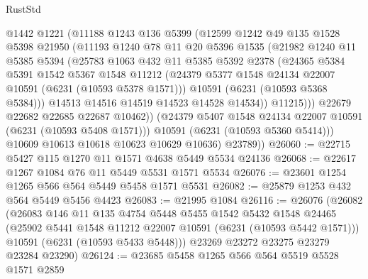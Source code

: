 \begin{lexlean}{RustStd}
\begin{coremodule}
{{                @1442
                @1221
                (@11188
                  @1243
                  @136
                  @5399
                  (@12599
                    @1242
                    @49
                    @135
                    @1528
                    @5398
                    @21950
                    (@11193
                      @1240
                      @78
                      @11
                      @20
                      @5396
                      @1535
                      (@21982
                        @1240
                        @11
                        @5385
                        @5394
                        (@25783
                          @1063
                          @432
                          @11
                          @5385
                          @5392
                          @2378
                          (@24365
                            @5384
                            @5391
                            @1542
                            @5367
                            @1548
                            @11212
                            (@24379 @5377 @1548 @24134 @22007 @10591 (@6231 (@10593 @5378 @1571)))
                            @10591
                            (@6231 (@10593 @5368 @5384)))
                          @14513
                          @14516
                          @14519
                          @14523
                          @14528
                          @14534))
                      @11215)))
                @22679
                @22682
                @22685
                @22687
                @10462))
            (@24379 @5407 @1548 @24134 @22007 @10591 (@6231 (@10593 @5408 @1571)))
            @10591
            (@6231 (@10593 @5360 @5414)))
          @10609
          @10613
          @10618
          @10623
          @10629
          @10636)
        @23789))
@26060 := @22715 @5427 @115 @1270 @11 @1571 @4638 @5449 @5534 @24136
@26068 := @22617 @1267 @1084 @76 @11 @5449 @5531 @1571 @5534
@26076 := @23601 @1254 @1265 @566 @564 @5449 @5458 @1571 @5531
@26082 := @25879 @1253 @432 @564 @5449 @5456 @4423
@26083 := @21995 @1084
@26116 := @26076
    (@26082
      (@26083
        @146
        @11
        @135
        @4754
        @5448
        @5455
        @1542
        @5432
        @1548
        @24465
        (@25902 @5441 @1548 @11212 @22007 @10591 (@6231 (@10593 @5442 @1571)))
        @10591
        (@6231 (@10593 @5433 @5448)))
      @23269
      @23272
      @23275
      @23279
      @23284
      @23290)
@26124 := @23685 @5458 @1265 @566 @564 @5519 @5528 @1571 @2859
}}
\end{coremodule}
\end{lexlean}
